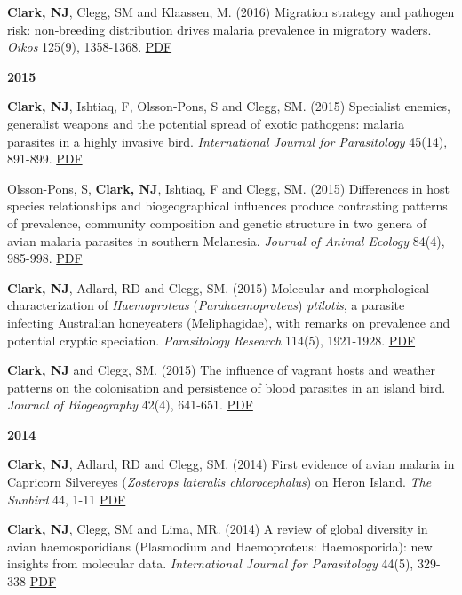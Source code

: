\documentclass[]{article}
\begin{document}
\textbf{Clark, NJ}, Clegg, SM and Klaassen, M. (2016) Migration strategy
and pathogen risk: non‐breeding distribution drives malaria prevalence
in migratory waders. \emph{Oikos} 125(9), 1358-1368.
\href{http://nicholasjclark.weebly.com/uploads/4/4/9/4/44946407/clark_et_al-oikos_2016.pdf}{PDF}

\textbf{2015}

\textbf{Clark, NJ}, Ishtiaq, F, Olsson-Pons, S and Clegg, SM. (2015)
Specialist enemies, generalist weapons and the potential spread of
exotic pathogens: malaria parasites in a highly invasive bird.
\emph{International Journal for Parasitology} 45(14), 891-899.
\href{http://nicholasjclark.weebly.com/uploads/4/4/9/4/44946407/clark_et_al_ijp_2015_mynas.pdf}{PDF}

Olsson-Pons, S, \textbf{Clark, NJ}, Ishtiaq, F and Clegg, SM. (2015)
Differences in host species relationships and biogeographical influences
produce contrasting patterns of prevalence, community composition and
genetic structure in two genera of avian malaria parasites in southern
Melanesia. \emph{Journal of Animal Ecology} 84(4), 985-998.
\href{https://nicholasjclark.weebly.com/uploads/4/4/9/4/44946407/olsson-pons_et_al-2015-journal_of_animal_ecology.pdf}{PDF}

\textbf{Clark, NJ}, Adlard, RD and Clegg, SM. (2015) Molecular and
morphological characterization of \emph{Haemoproteus}
(\emph{Parahaemoproteus}) \emph{ptilotis}, a parasite infecting
Australian honeyeaters (Meliphagidae), with remarks on prevalence and
potential cryptic speciation. \emph{Parasitology Research} 114(5),
1921-1928.
\href{http://nicholasjclark.weebly.com/uploads/4/4/9/4/44946407/clark_et_al_paras_res_2015.pdf}{PDF}

\textbf{Clark, NJ} and Clegg, SM. (2015) The influence of vagrant hosts
and weather patterns on the colonisation and persistence of blood
parasites in an island bird. \emph{Journal of Biogeography} 42(4),
641-651.
\href{http://nicholasjclark.weebly.com/uploads/4/4/9/4/44946407/clark_and_cleggjbi_proofs.pdf}{PDF}

\textbf{2014}

\textbf{Clark, NJ}, Adlard, RD and Clegg, SM. (2014) First evidence of
avian malaria in Capricorn Silvereyes (\emph{Zosterops lateralis
chlorocephalus}) on Heron Island. \emph{The Sunbird} 44, 1-11
\href{http://nicholasjclark.weebly.com/uploads/4/4/9/4/44946407/sunbird_44_1__avian_malaria_author_copy.pdf}{PDF}

\textbf{Clark, NJ}, Clegg, SM and Lima, MR. (2014) A review of global
diversity in avian haemosporidians (Plasmodium and Haemoproteus:
Haemosporida): new insights from molecular data. \emph{International
Journal for Parasitology} 44(5), 329-338
\href{http://nicholasjclark.weebly.com/uploads/4/4/9/4/44946407/clark_et_al_ijp_2014_published_version.pdf}{PDF}
\end{document}
